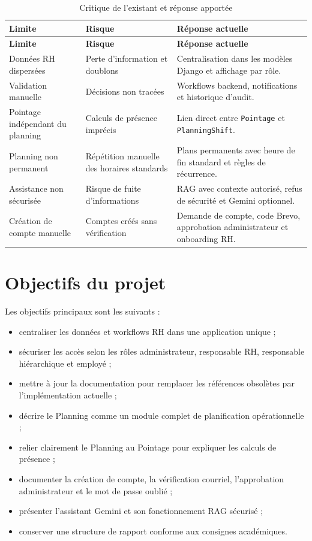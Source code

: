 \documentclass[12pt,a4paper]{report}
\begin{document}
\begin{longtable}{>{\raggedright\arraybackslash}p{4cm}>{\raggedright\arraybackslash}p{4cm}>{\raggedright\arraybackslash}p{6cm}}
\caption{Critique de l'existant et réponse apportée}\label{tab:critique-existant}\\
\toprule
\textbf{Limite} & \textbf{Risque} & \textbf{Réponse actuelle} \\
\midrule
\endfirsthead
\toprule
\textbf{Limite} & \textbf{Risque} & \textbf{Réponse actuelle} \\
\midrule
\endhead
Données RH dispersées & Perte d'information et doublons & Centralisation dans les modèles Django et affichage par rôle. \\
Validation manuelle & Décisions non tracées & Workflows backend, notifications et historique d'audit. \\
Pointage indépendant du planning & Calculs de présence imprécis & Lien direct entre \texttt{Pointage} et \texttt{PlanningShift}. \\
Planning non permanent & Répétition manuelle des horaires standards & Plans permanents avec heure de fin standard et règles de récurrence. \\
Assistance non sécurisée & Risque de fuite d'informations & RAG avec contexte autorisé, refus de sécurité et Gemini optionnel. \\
Création de compte manuelle & Comptes créés sans vérification & Demande de compte, code Brevo, approbation administrateur et onboarding RH. \\
\bottomrule
\end{longtable}


\section{Objectifs du projet}
Les objectifs principaux sont les suivants :
\begin{itemize}
\item centraliser les données et workflows RH dans une application unique ;
\item sécuriser les accès selon les rôles administrateur, responsable RH, responsable hiérarchique et employé ;
\item mettre à jour la documentation pour remplacer les références obsolètes par l'implémentation actuelle ;
\item décrire le Planning comme un module complet de planification opérationnelle ;
\item relier clairement le Planning au Pointage pour expliquer les calculs de présence ;
\item documenter la création de compte, la vérification courriel, l'approbation administrateur et le mot de passe oublié ;
\item présenter l'assistant Gemini et son fonctionnement RAG sécurisé ;
\item conserver une structure de rapport conforme aux consignes académiques.
\end{itemize}
\end{document}

